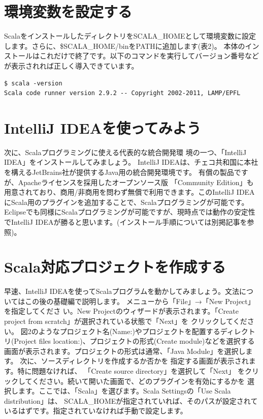 \documentclass[10pt]{jarticle}
\begin{document}
\section{環境変数を設定する}
ScalaをインストールしたディレクトリをSCALA\_HOMEとして環境変数に設定します。さらに、\$SCALA\_HOME/binをPATHに追加します(表2)。 本体のインストールはこれだけで終了です。以下のコマンドを実行してバージョン番号などが表示されれば正しく導入できています。

\begin{verbatim}
$ scala -version
Scala code runner version 2.9.2 -- Copyright 2002-2011, LAMP/EPFL
\end{verbatim}

\section{IntelliJ IDEAを使ってみよう}
次に、Scalaプログラミングに使える代表的な統合開発環 境の一つ、「IntelliJ IDEA」をインストールしてみましょう。 IntelliJ IDEAは、チェコ共和国に本社を構えるJetBrains社が提供するJava用の統合開発環境です。 有償の製品ですが、Apacheライセンスを採用したオープンソース版 「Community Edition」も用意されており、商用/非商用を問わず無償で利用できます。このIntelliJ IDEAにScala用のプラグインを追加することで、Scalaプログラミングが可能です。Eclipseでも同様にScalaプログラミングが可能ですが、現時点では動作の安定性でIntelliJ IDEAが勝ると思います。(インストール手順については別掲記事を参照)。

\section{Scala対応プロジェクトを作成する}
早速、IntelliJ IDEAを使ってScalaプログラムを動かしてみましょう。文法についてはこの後の基礎編で説明します。 メニューから「File」→「New Project」を指定してくださ い。New Projectのウィザードが表示されます。「Create project from scratch」が選択されている状態で「Next」を クリックしてください。 図2のようなプロジェクト名(Name:)やプロジェクトを配置するディレクトリ(Project files location:)、プロジェクトの形式(Create module)などを選択する画面が表示されます。プロジェクトの形式は通常、「Java Module」を選択します。 次に、ソースディレクトリを作成するか否かを 指定する画面が表示されます。特に問題なければ、 「Create source directory」を選択して「Next」 をクリックしてください。続いて開いた画面で、どのプラグインを有効にするかを 選択します。ここでは、「Scala」を選びます。Scala Settingsの「Use Scala distribution」は、 SCALA\_HOMEが指定されていれば、そのパスが設定されているはずです。指定されていなければ手動で設定します。
\end{document}
